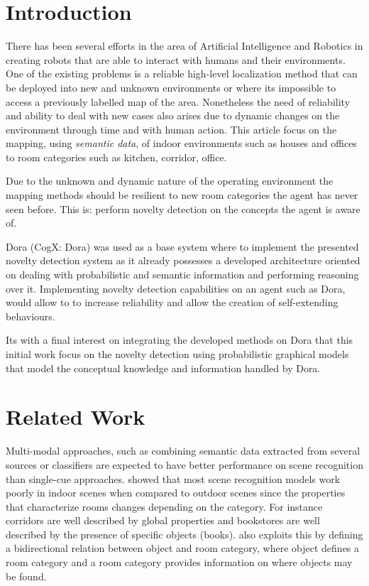 \documentclass[runningheads,a4paper]{llncs}
\begin{document}
\section{Introduction}
There has been several efforts in the area of Artificial Intelligence and Robotics
in creating robots that are able to interact with humans and their environments.
One of the existing problems is a reliable high-level localization method that can
be deployed into new and unknown environments or where its impossible to access a
previously labelled map of the area. Nonetheless the need of reliability and ability
to deal with new cases also arises due to dynamic changes on the environment through
time and with human action.
This article focus on the mapping, using \emph{semantic data}, of indoor
environments such as houses and offices to room categories such as kitchen,
corridor, office.

Due to the unknown and dynamic nature of the operating environment the
mapping methods should be resilient to new room categories the agent has never seen
before. This is: perform novelty detection on the concepts the agent is aware of.

Dora\cite{dora} (CogX: Dora) was used as a base system where to implement the
presented novelty detection system as it already possesses a developed architecture
oriented on dealing with probabilistic and semantic information and performing
reasoning over it.
Implementing novelty detection capabilities on an agent such as Dora, would allow to
to increase reliability and allow the creation of self-extending behaviours.

Its with a final interest on integrating the developed methods on Dora that this
initial work focus on the novelty detection using probabilistic graphical models
that model the conceptual knowledge and information handled by Dora.


\section{Related Work}
Multi-modal approaches, such as combining semantic data extracted from
several sources or classifiers are expected to have better performance on scene
recognition than single-cue approaches. \cite{quattoni2009recognizing}
showed that most scene recognition models work poorly in indoor scenes when
compared to outdoor scenes since the properties that
characterize rooms changes depending on the category. For instance corridors are well
described by global properties and bookstores are well described by the presence of
specific objects (books).
\cite{galindo2005multi} also exploits this by defining a bidirectional relation
between object and room category, where object defines a room category and a room
category provides information on where objects may be found.
\end{document}
